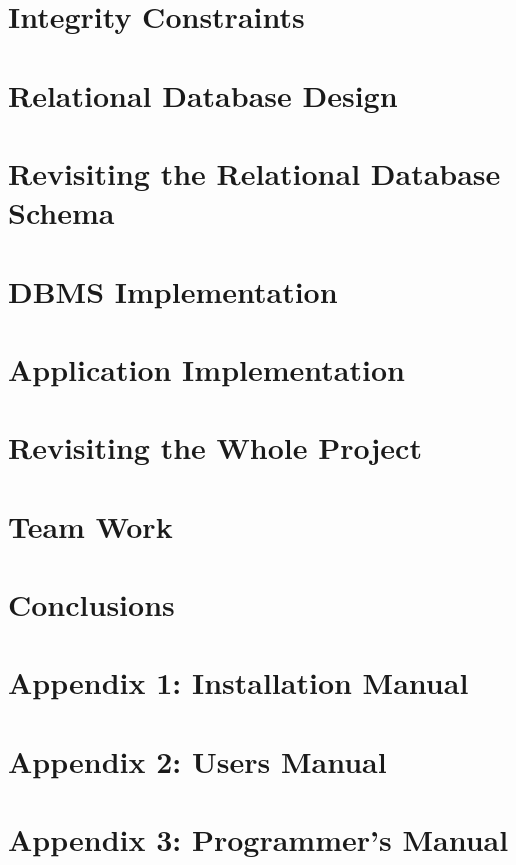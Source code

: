 \documentclass{acm_proc_article-sp}
\begin{document}
\section{Integrity Constraints}
\section{Relational Database Design}
\section{Revisiting the Relational Database Schema}
\section{DBMS Implementation}
\section{Application Implementation}
\section{Revisiting the Whole Project}
\section{Team Work}
\section{Conclusions}
\section{Appendix 1: Installation Manual}
\section{Appendix 2: Users Manual}
\section{Appendix 3: Programmer's Manual}
\end{document}
